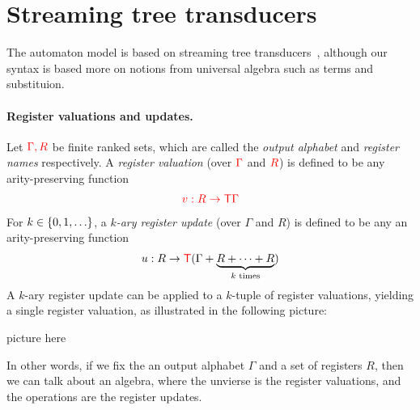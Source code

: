 


\section{Streaming tree transducers}
\label{sec:stt}
The automaton model is based on streaming tree transducers~\cite{alur2017streaming}, although our syntax is based more on notions from universal algebra such as terms and substituion.





\paragraph*{Register valuations and updates.}   Let ${\color{red}{\Gamma, R}}$ be finite ranked sets, which are called the \emph{output alphabet} and \emph{register names} respectively.  
A \emph{register valuation} (over ${\color{red}{\Gamma}}$ and ${\color{red}{R}}$) is defined to be any arity-preserving function
\begin{align*}
    {\color{red}{v : R \to {\color{red}{\mathsf T}}\Gamma}}
\end{align*}
For  $k \in \{0,1,\ldots\}$, a \emph{$k$-ary register update} (over $\Gamma$ and $R$) is defined to be any an arity-preserving function
\begin{align*}
    u : R \to {\color{red}{\mathsf T}} ( \Gamma + \underbrace{R + \cdots +R}_{\text{$k$ times}})
\end{align*}
A $k$-ary register update can be applied to a $k$-tuple of register valuations, yielding a single register valuation, as illustrated in the following picture:
\begin{center}
    picture here
\end{center}
In other words, if we fix the an output alphabet $\Gamma$ and a set of registers $R$, then we can talk about an algebra, where the unvierse is the register valuations, and the operations are the register updates.

